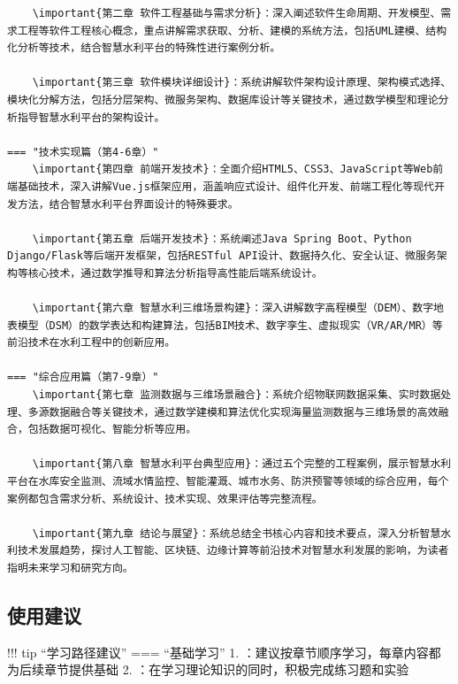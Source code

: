 \begin{verbatim}
    \important{第二章 软件工程基础与需求分析}：深入阐述软件生命周期、开发模型、需求工程等软件工程核心概念，重点讲解需求获取、分析、建模的系统方法，包括UML建模、结构化分析等技术，结合智慧水利平台的特殊性进行案例分析。
    
    \important{第三章 软件模块详细设计}：系统讲解软件架构设计原理、架构模式选择、模块化分解方法，包括分层架构、微服务架构、数据库设计等关键技术，通过数学模型和理论分析指导智慧水利平台的架构设计。

=== "技术实现篇（第4-6章）"
    \important{第四章 前端开发技术}：全面介绍HTML5、CSS3、JavaScript等Web前端基础技术，深入讲解Vue.js框架应用，涵盖响应式设计、组件化开发、前端工程化等现代开发方法，结合智慧水利平台界面设计的特殊要求。
    
    \important{第五章 后端开发技术}：系统阐述Java Spring Boot、Python Django/Flask等后端开发框架，包括RESTful API设计、数据持久化、安全认证、微服务架构等核心技术，通过数学推导和算法分析指导高性能后端系统设计。
    
    \important{第六章 智慧水利三维场景构建}：深入讲解数字高程模型（DEM）、数字地表模型（DSM）的数学表达和构建算法，包括BIM技术、数字孪生、虚拟现实（VR/AR/MR）等前沿技术在水利工程中的创新应用。

=== "综合应用篇（第7-9章）"
    \important{第七章 监测数据与三维场景融合}：系统介绍物联网数据采集、实时数据处理、多源数据融合等关键技术，通过数学建模和算法优化实现海量监测数据与三维场景的高效融合，包括数据可视化、智能分析等应用。
    
    \important{第八章 智慧水利平台典型应用}：通过五个完整的工程案例，展示智慧水利平台在水库安全监测、流域水情监控、智能灌溉、城市水务、防洪预警等领域的综合应用，每个案例都包含需求分析、系统设计、技术实现、效果评估等完整流程。
    
    \important{第九章 结论与展望}：系统总结全书核心内容和技术要点，深入分析智慧水利技术发展趋势，探讨人工智能、区块链、边缘计算等前沿技术对智慧水利发展的影响，为读者指明未来学习和研究方向。
\end{verbatim}

\hypertarget{ux4f7fux7528ux5efaux8bae}{%
\subsection{使用建议}\label{ux4f7fux7528ux5efaux8bae}}

!!! tip ``学习路径建议'' === ``基础学习'' 1. ：建议按章节顺序学习，每章内容都为后续章节提供基础 2. ：在学习理论知识的同时，积极完成练习题和实验


